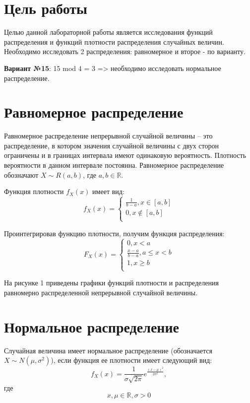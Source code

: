 
\section*{Цель работы}
Целью данной лабораторной работы является исследования функций распределения и функций плотности распределения случайных величин. Необходимо исследовать 2 распределения: равномерное и второе - по варианту.

\textbf{Вариант №15}: 15 mod 4 = 3 => необходимо исследовать нормальное распределение.




\section*{Равномерное распределение}
Равномерное распределение непрерывной случайной величины – это распределение, в котором значения случайной величины с двух сторон ограничены и в границах интервала имеют одинаковую вероятность.
Плотность вероятности в данном интервале постоянна. Равномерное
распределение обозначают $X \sim R(a, b)$, где $a, b \in \mathbb{R}$.

Функция плотности $f_{X} (x)$ имеет вид:
$$
f_{X} (x) = 
\left\{\begin{matrix}
	\frac{1}{b - a}, x \in [a, b]\\ 
	0, x \notin [a, b] \\
\end{matrix}\right.
$$

Проинтегрировав функцию плотности, получим функция распределения:
$$
F_{X} (x) = 
\left\{\begin{matrix}
	0, x < a \\
	\frac{x - a}{b - a}, a \le x < b\\ 
	1, x \ge b \\
\end{matrix}\right.
$$

На рисунке 1 приведены графики функций плотности и распределения равномерно распределенной непрерывной случайной величины.




\section*{Нормальное распределение}

Случайная величина имеет нормальное распределение (обозначается $X \sim N(\mu, \sigma^2)$), если функция ее плотности имеет следующий вид:
$$
f_{X} (x) = \frac{1}{\sigma\sqrt{2\pi}}e^{\frac{(x - \mu)^2}{2\sigma^2}},
$$
где
$$x, \mu \in \mathbb{R}, \sigma > 0$$

